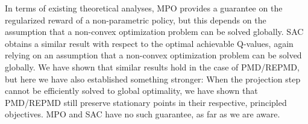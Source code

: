 In terms of existing theoretical analyses, 
MPO provides a guarantee on the regularized reward of a non-parametric policy,
but this depends on the assumption that a non-convex optimization problem
can be solved globally.
SAC obtains a similar result with respect to the optimal achievable
Q-values, again relying on an assumption that a non-convex optimization
problem can be solved globally.
We have shown that similar results hold in the case of PMD/REPMD,
but here we have also established something stronger:
When the projection step cannot be efficiently solved to global optimality,
we have shown that PMD/REPMD still preserve stationary points in 
their respective, principled objectives.
MPO and SAC have no such guarantee, as far as we are aware. 

